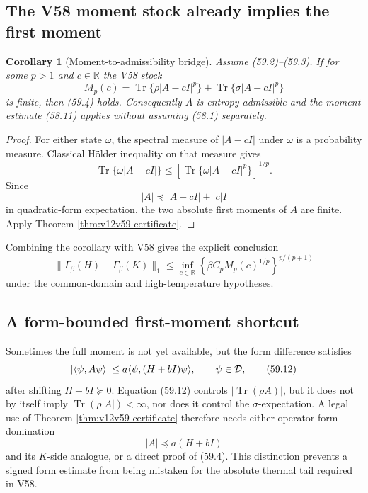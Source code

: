 \documentclass[11pt]{article}
\newtheorem{corollary}[theorem]{Corollary}
\theoremstyle{remark}
\begin{document}
\subsection{The V58 moment stock already implies the first moment}

\begin{corollary}[Moment-to-admissibility bridge]
\label{cor:v12v59-moment-bridge}
Assume (59.2)--(59.3).  If for some \(p>1\) and \(c\in\mathbb R\)
the V58 stock
\[
 M_p(c)
 =
 \operatorname{Tr}\{\rho|A-cI|^p\}
 +
 \operatorname{Tr}\{\sigma|A-cI|^p\}
\]
is finite, then (59.4) holds.  Consequently \(A\) is entropy
admissible and the moment estimate (58.11) applies without assuming
(58.1) separately.
\end{corollary}

\begin{proof}
For either state \(\omega\), the spectral measure of
\(|A-cI|\) under \(\omega\) is a probability measure.  Classical
Hölder inequality on that measure gives
\[
 \operatorname{Tr}\{\omega|A-cI|\}
 \leq
 \left[
 \operatorname{Tr}\{\omega|A-cI|^p\}
 \right]^{1/p}.
\]
Since
\[
                         |A|
 \preceq |A-cI|+|c|I
\]
in quadratic-form expectation, the two absolute first moments of
\(A\) are finite.  Apply Theorem
\ref{thm:v12v59-certificate}.
\end{proof}

Combining the corollary with V58 gives the explicit conclusion
\begin{equation}
 \|\Gamma_\beta(H)-\Gamma_\beta(K)\|_1
 \leq
 \inf_{c\in\mathbb R}
 \left\{\beta C_pM_p(c)^{1/p}\right\}^{p/(p+1)}
                                                        \tag{59.11}
\end{equation}
under the common-domain and high-temperature hypotheses.

\subsection{A form-bounded first-moment shortcut}

Sometimes the full moment is not yet available, but the form
difference satisfies
\begin{equation}
 |\langle\psi,A\psi\rangle|
 \leq
 a\langle\psi,(H+bI)\psi\rangle,
 \qquad\psi\in{\cal D},                            \tag{59.12}
\end{equation}
after shifting \(H+bI\succeq0\).  Equation (59.12) controls
\(|\operatorname{Tr}(\rho A)|\), but it does not by itself imply
\(\operatorname{Tr}(\rho|A|)<\infty\), nor does it control the
\(\sigma\)-expectation.  A legal use of Theorem
\ref{thm:v12v59-certificate} therefore needs either operator-form
domination
\[
                         |A|\preceq a(H+bI)
                                                        \tag{59.13}
\]
and its \(K\)-side analogue, or a direct proof of (59.4).
This distinction prevents a signed form estimate from being
mistaken for the absolute thermal tail required in V58.
\end{document}
